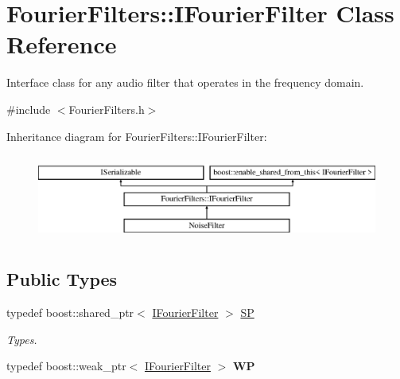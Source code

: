 \hypertarget{class_fourier_filters_1_1_i_fourier_filter}{}\section{Fourier\+Filters\+:\+:I\+Fourier\+Filter Class Reference}
\label{class_fourier_filters_1_1_i_fourier_filter}


Interface class for any audio filter that operates in the frequency domain.  




{\ttfamily \#include $<$Fourier\+Filters.\+h$>$}

Inheritance diagram for Fourier\+Filters\+:\+:I\+Fourier\+Filter\+:\begin{figure}[H]
\begin{center}
\leavevmode
\includegraphics[height=2.837838cm]{class_fourier_filters_1_1_i_fourier_filter}
\end{center}
\end{figure}
\subsection*{Public Types}
\begin{DoxyCompactItemize}
\item 
\mbox{\label{class_fourier_filters_1_1_i_fourier_filter_acad39dd74318f8f8b06d80a00b19f8cb}} 
typedef boost\+::shared\+\_\+ptr$<$ \hyperlink{class_fourier_filters_1_1_i_fourier_filter}{I\+Fourier\+Filter} $>$ \hyperlink{class_fourier_filters_1_1_i_fourier_filter_acad39dd74318f8f8b06d80a00b19f8cb}{SP}
\begin{DoxyCompactList}\small\item\em Types. \end{DoxyCompactList}\item 
\mbox{\label{class_fourier_filters_1_1_i_fourier_filter_a888cfd98c5b02741453aa299b5726f3c}} 
typedef boost\+::weak\+\_\+ptr$<$ \hyperlink{class_fourier_filters_1_1_i_fourier_filter}{I\+Fourier\+Filter} $>$ {\bfseries WP}
\end{DoxyCompactItemize}
